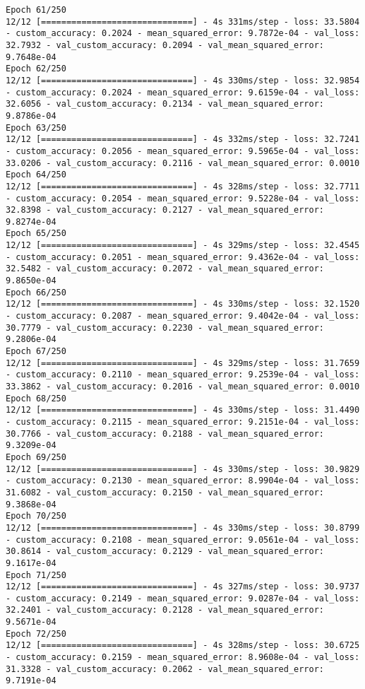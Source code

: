\begin{lstlisting}
Epoch 61/250
12/12 [==============================] - 4s 331ms/step - loss: 33.5804 - custom_accuracy: 0.2024 - mean_squared_error: 9.7872e-04 - val_loss: 32.7932 - val_custom_accuracy: 0.2094 - val_mean_squared_error: 9.7648e-04
Epoch 62/250
12/12 [==============================] - 4s 330ms/step - loss: 32.9854 - custom_accuracy: 0.2024 - mean_squared_error: 9.6159e-04 - val_loss: 32.6056 - val_custom_accuracy: 0.2134 - val_mean_squared_error: 9.8786e-04
Epoch 63/250
12/12 [==============================] - 4s 332ms/step - loss: 32.7241 - custom_accuracy: 0.2056 - mean_squared_error: 9.5965e-04 - val_loss: 33.0206 - val_custom_accuracy: 0.2116 - val_mean_squared_error: 0.0010
Epoch 64/250
12/12 [==============================] - 4s 328ms/step - loss: 32.7711 - custom_accuracy: 0.2054 - mean_squared_error: 9.5228e-04 - val_loss: 32.8398 - val_custom_accuracy: 0.2127 - val_mean_squared_error: 9.8274e-04
Epoch 65/250
12/12 [==============================] - 4s 329ms/step - loss: 32.4545 - custom_accuracy: 0.2051 - mean_squared_error: 9.4362e-04 - val_loss: 32.5482 - val_custom_accuracy: 0.2072 - val_mean_squared_error: 9.8650e-04
Epoch 66/250
12/12 [==============================] - 4s 330ms/step - loss: 32.1520 - custom_accuracy: 0.2087 - mean_squared_error: 9.4042e-04 - val_loss: 30.7779 - val_custom_accuracy: 0.2230 - val_mean_squared_error: 9.2806e-04
Epoch 67/250
12/12 [==============================] - 4s 329ms/step - loss: 31.7659 - custom_accuracy: 0.2110 - mean_squared_error: 9.2539e-04 - val_loss: 33.3862 - val_custom_accuracy: 0.2016 - val_mean_squared_error: 0.0010
Epoch 68/250
12/12 [==============================] - 4s 330ms/step - loss: 31.4490 - custom_accuracy: 0.2115 - mean_squared_error: 9.2151e-04 - val_loss: 30.7766 - val_custom_accuracy: 0.2188 - val_mean_squared_error: 9.3209e-04
Epoch 69/250
12/12 [==============================] - 4s 330ms/step - loss: 30.9829 - custom_accuracy: 0.2130 - mean_squared_error: 8.9904e-04 - val_loss: 31.6082 - val_custom_accuracy: 0.2150 - val_mean_squared_error: 9.3868e-04
Epoch 70/250
12/12 [==============================] - 4s 330ms/step - loss: 30.8799 - custom_accuracy: 0.2108 - mean_squared_error: 9.0561e-04 - val_loss: 30.8614 - val_custom_accuracy: 0.2129 - val_mean_squared_error: 9.1617e-04
Epoch 71/250
12/12 [==============================] - 4s 327ms/step - loss: 30.9737 - custom_accuracy: 0.2149 - mean_squared_error: 9.0287e-04 - val_loss: 32.2401 - val_custom_accuracy: 0.2128 - val_mean_squared_error: 9.5671e-04
Epoch 72/250
12/12 [==============================] - 4s 328ms/step - loss: 30.6725 - custom_accuracy: 0.2159 - mean_squared_error: 8.9608e-04 - val_loss: 31.3328 - val_custom_accuracy: 0.2062 - val_mean_squared_error: 9.7191e-04

\end{lstlisting}
